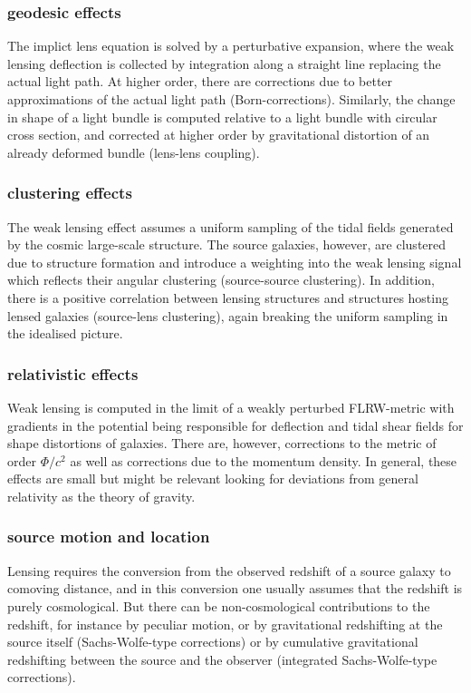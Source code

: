 \subsubsection{geodesic effects}
The implict lens equation is solved by a perturbative expansion, where the weak lensing deflection is collected by integration along a straight line replacing the actual light path. At higher order, there are corrections due to better approximations of the actual light path (Born-corrections). Similarly, the change in shape of a light bundle is computed relative to a light bundle with circular cross section, and corrected at higher order by gravitational distortion of an already deformed bundle (lens-lens coupling).


\subsubsection{clustering effects}
The weak lensing effect assumes a uniform sampling of the tidal fields generated by the cosmic large-scale structure. The source galaxies, however, are clustered due to structure formation and introduce a weighting into the weak lensing  signal which reflects their angular clustering (source-source clustering). In addition, there is a positive correlation between lensing structures and structures hosting lensed galaxies (source-lens clustering), again breaking the uniform sampling in the idealised picture.


\subsubsection{relativistic effects}
Weak lensing is computed in the limit of a weakly perturbed FLRW-metric with gradients in the potential being responsible for deflection and tidal shear fields for shape distortions of galaxies. There are, however, corrections to the metric of order $\Phi/c^2$ as well as corrections due to the momentum density. In general, these effects are small but might be relevant looking for deviations from general relativity as the theory of gravity.


\subsubsection{source motion and location}
Lensing requires the conversion from the observed redshift of a source galaxy to comoving distance, and in this conversion one usually assumes that the redshift is purely cosmological. But there can be non-cosmological contributions to the redshift, for instance by peculiar motion, or by gravitational redshifting at the source itself (Sachs-Wolfe-type corrections) or by cumulative gravitational redshifting between the source and the observer (integrated Sachs-Wolfe-type corrections).

